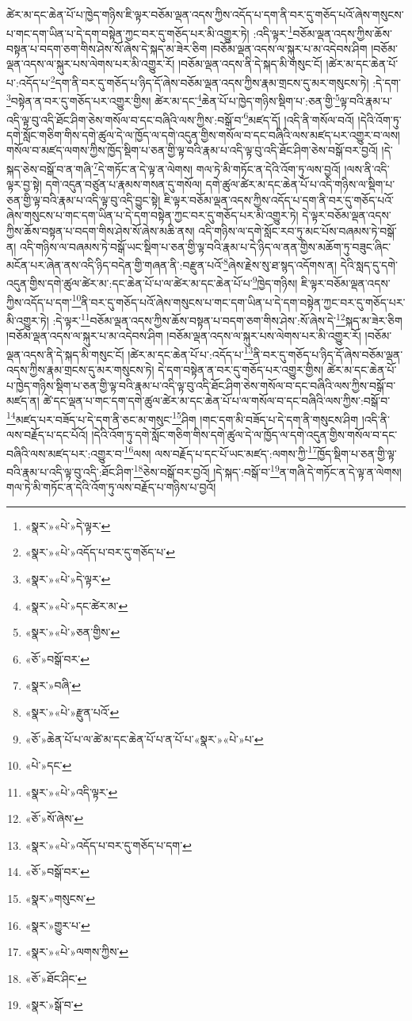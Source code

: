 ཚེར་མ་དང་ཆེན་པོ་པ་ཁྱེད་གཉིས་ཇི་ལྟར་བཅོམ་ལྡན་འདས་ཀྱིས་འདོད་པ་དག་ནི་བར་དུ་གཅོད་པའོ་ཞེས་གསུངས་པ་གང་དག་ཡིན་པ་དེ་དག་བསྟེན་ཀྱང་བར་དུ་གཅོད་པར་མི་འགྱུར་ཏེ། :འདི་ལྟར་\footnote{«སྣར་»«པེ་»དེ་ལྟར་}བཅོམ་ལྡན་འདས་ཀྱིས་ཆོས་བསྟན་པ་བདག་ཅག་གིས་ཤེས་སོ་ཞེས་དེ་སྐད་མ་ཟེར་ཅིག །བཅོམ་ལྡན་འདས་ལ་སྐུར་པ་མ་འདེབས་ཤིག །བཅོམ་ལྡན་འདས་ལ་སྐུར་པས་ལེགས་པར་མི་འགྱུར་རོ། །བཅོམ་ལྡན་འདས་ནི་དེ་སྐད་མི་གསུང་ངོ། །ཚེར་མ་དང་ཆེན་པོ་པ་:འདོད་པ་\footnote{«སྣར་»«པེ་»འདོད་པ་བར་དུ་གཅོད་པ་}དག་ནི་བར་དུ་གཅོད་པ་ཉིད་དོ་ཞེས་བཅོམ་ལྡན་འདས་ཀྱིས་རྣམ་གྲངས་དུ་མར་གསུངས་ཏེ། :དེ་དག་\footnote{«སྣར་»«པེ་»དེ་ལྟར་}བསྟེན་ན་བར་དུ་གཅོད་པར་འགྱུར་གྱིས། ཚེར་མ་དང་\footnote{«སྣར་»«པེ་»དང་ཚེར་མ་}ཆེན་པོ་པ་ཁྱེད་གཉིས་སྡིག་པ་:ཅན་གྱི་\footnote{«སྣར་»«པེ་»ཅན་གྱིས་}ལྟ་བའི་རྣམ་པ་འདི་ལྟ་བུ་འདི་ཐོང་ཤིག་ཅེས་གསོལ་བ་དང་བཞིའི་ལས་ཀྱིས་:བསྒོ་བ་\footnote{«ཅོ་»བསྒོ་བར་}མཛད་དོ། །འདི་ནི་གསོལ་བའོ། །དེའི་འོག་ཏུ་དགེ་སློང་གཅིག་གིས་དགེ་ཚུལ་དེ་ལ་ཁྱོད་ལ་དགེ་འདུན་གྱིས་གསོལ་བ་དང་བཞིའི་ལས་མཛད་པར་འགྱུར་བ་ལས། གསོལ་བ་མཛད་ལགས་ཀྱིས་ཁྱོད་སྡིག་པ་ཅན་གྱི་ལྟ་བའི་རྣམ་པ་འདི་ལྟ་བུ་འདི་ཐོང་ཤིག་ཅེས་བསྒོ་བར་བྱའོ། །དེ་སྐད་ཅེས་བསྒོ་བ་ན་གཞི་\footnote{«སྣར་»བཞི་}དེ་གཏོང་ན་དེ་ལྟ་ན་ལེགས། གལ་ཏེ་མི་གཏོང་ན་དེའི་འོག་ཏུ་ལས་བྱའོ། །ལས་ནི་འདི་ལྟར་བྱ་སྟེ། དགེ་འདུན་བཙུན་པ་རྣམས་གསན་དུ་གསོལ། དགེ་ཚུལ་ཚེར་མ་དང་ཆེན་པོ་པ་འདི་གཉིས་ལ་སྡིག་པ་ཅན་གྱི་ལྟ་བའི་རྣམ་པ་འདི་ལྟ་བུ་འདི་བྱུང་སྟེ། ཇི་ལྟར་བཅོམ་ལྡན་འདས་ཀྱིས་འདོད་པ་དག་ནི་བར་དུ་གཅོད་པའོ་ཞེས་གསུངས་པ་གང་དག་ཡིན་པ་དེ་དག་བསྟེན་ཀྱང་བར་དུ་གཅོད་པར་མི་འགྱུར་ཏེ། དེ་ལྟར་བཅོམ་ལྡན་འདས་ཀྱིས་ཆོས་བསྟན་པ་བདག་གིས་ཤེས་སོ་ཞེས་མཆི་ནས། འདི་གཉིས་ལ་དགེ་སློང་རབ་ཏུ་མང་པོས་བཞམས་ཏེ་བསྒོ་ན། འདི་གཉིས་ལ་བཞམས་ཏེ་བསྒོ་ཡང་སྡིག་པ་ཅན་གྱི་ལྟ་བའི་རྣམ་པ་དེ་ཉིད་ལ་ནན་གྱིས་མཆོག་ཏུ་བཟུང་ཞིང་མངོན་པར་ཞེན་ནས་འདི་ཉིད་བདེན་གྱི་གཞན་ནི་:བརྫུན་པའོ་\footnote{«སྣར་»«པེ་»རྫུན་པའོ་}ཞེས་རྗེས་སུ་ཐ་སྙད་འདོགས་ན། དེའི་སླད་དུ་དགེ་འདུན་གྱིས་དགེ་ཚུལ་ཚེར་མ་:དང་ཆེན་པོ་པ་ལ་ཚེར་མ་དང་ཆེན་པོ་པ་\footnote{«ཅོ་»ཆེན་པོ་པ་ལ་ཚེ་མ་དང་ཆེན་པོ་པ་ན་པོ་པ་«སྣར་»«པེ་»པ་}ཁྱེད་གཉིས། ཇི་ལྟར་བཅོམ་ལྡན་འདས་ཀྱིས་འདོད་པ་དག་\footnote{«པེ་»དང་}ནི་བར་དུ་གཅོད་པའོ་ཞེས་གསུངས་པ་གང་དག་ཡིན་པ་དེ་དག་བསྟེན་ཀྱང་བར་དུ་གཅོད་པར་མི་འགྱུར་ཏེ། :དེ་ལྟར་\footnote{«སྣར་»«པེ་»འདི་ལྟར་}བཅོམ་ལྡན་འདས་ཀྱིས་ཆོས་བསྟན་པ་བདག་ཅག་གིས་ཤེས་:སོ་ཞེས་དེ་\footnote{«ཅོ་»སོ་ཞེས་}སྐད་མ་ཟེར་ཅིག །བཅོམ་ལྡན་འདས་ལ་སྐུར་པ་མ་འདེབས་ཤིག །བཅོམ་ལྡན་འདས་ལ་སྐུར་པས་ལེགས་པར་མི་འགྱུར་རོ། །བཅོམ་ལྡན་འདས་ནི་དེ་སྐད་མི་གསུང་ངོ། །ཚེར་མ་དང་ཆེན་པོ་པ་:འདོད་པ་\footnote{«སྣར་»«པེ་»འདོད་པ་བར་དུ་གཅོད་པ་དག་}ནི་བར་དུ་གཅོད་པ་ཉིད་དོ་ཞེས་བཅོམ་ལྡན་འདས་ཀྱིས་རྣམ་གྲངས་དུ་མར་གསུངས་ཏེ། དེ་དག་བསྟེན་ན་བར་དུ་གཅོད་པར་འགྱུར་གྱིས། ཚེར་མ་དང་ཆེན་པོ་པ་ཁྱེད་གཉིས་སྡིག་པ་ཅན་གྱི་ལྟ་བའི་རྣམ་པ་འདི་ལྟ་བུ་འདི་ཐོང་ཤིག་ཅེས་གསོལ་བ་དང་བཞིའི་ལས་ཀྱིས་བསྒོ་བ་མཛད་ན། ཚེ་དང་ལྡན་པ་གང་དག་དགེ་ཚུལ་ཚེར་མ་དང་ཆེན་པོ་པ་ལ་གསོལ་བ་དང་བཞིའི་ལས་ཀྱིས་:བསྒོ་བ་\footnote{«ཅོ་»བསྒོ་བར་}མཛད་པར་བཟོད་པ་དེ་དག་ནི་ཅང་མ་གསུང་\footnote{«སྣར་»གསུངས་}ཤིག །གང་དག་མི་བཟོད་པ་དེ་དག་ནི་གསུངས་ཤིག །འདི་ནི་ལས་བརྗོད་པ་དང་པོའོ། །དེའི་འོག་ཏུ་དགེ་སློང་གཅིག་གིས་དགེ་ཚུལ་དེ་ལ་ཁྱོད་ལ་དགེ་འདུན་གྱིས་གསོལ་བ་དང་བཞིའི་ལས་མཛད་པར་:འགྱུར་བ་\footnote{«སྣར་»གྱུར་པ་}ལས། ལས་བརྗོད་པ་དང་པོ་ཡང་མཛད་:ལགས་ཀྱི་\footnote{«སྣར་»«པེ་»ལགས་ཀྱིས་}ཁྱོད་སྡིག་པ་ཅན་གྱི་ལྟ་བའི་རྣམ་པ་འདི་ལྟ་བུ་འདི་:ཐོང་ཤིག་\footnote{«ཅོ་»ཐོང་ཤིང་}ཅེས་བསྒོ་བར་བྱའོ། །དེ་སྐད་:བསྒོ་བ་\footnote{«སྣར་»སྒོ་བ་}ན་གཞི་དེ་གཏོང་ན་དེ་ལྟ་ན་ལེགས། གལ་ཏེ་མི་གཏོང་ན་དེའི་འོག་ཏུ་ལས་བརྗོད་པ་གཉིས་པ་བྱའོ། 